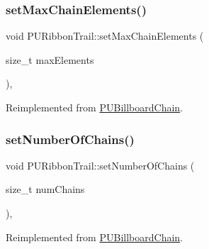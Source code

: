 \subsubsection{\texorpdfstring{set\+Max\+Chain\+Elements()}{setMaxChainElements()}\hspace{0.1cm}{\footnotesize\ttfamily [2/2]}}
{\footnotesize\ttfamily void P\+U\+Ribbon\+Trail\+::set\+Max\+Chain\+Elements (\begin{DoxyParamCaption}\item[{size\+\_\+t}]{max\+Elements }\end{DoxyParamCaption})\hspace{0.3cm}{\ttfamily [override]}, {\ttfamily [virtual]}}







Reimplemented from \hyperlink{classPUBillboardChain_aa58e00d60390334e66dd7742f708ee76}{P\+U\+Billboard\+Chain}.

\mbox{\label{classPURibbonTrail_a73dff6c67263bc49678ce73a16d03756}} 
\subsubsection{\texorpdfstring{set\+Number\+Of\+Chains()}{setNumberOfChains()}\hspace{0.1cm}{\footnotesize\ttfamily [1/2]}}
{\footnotesize\ttfamily void P\+U\+Ribbon\+Trail\+::set\+Number\+Of\+Chains (\begin{DoxyParamCaption}\item[{size\+\_\+t}]{num\+Chains }\end{DoxyParamCaption})\hspace{0.3cm}{\ttfamily [override]}, {\ttfamily [virtual]}}







Reimplemented from \hyperlink{classPUBillboardChain_afb09bb4c28a0475beb2c6575c7eeffa5}{P\+U\+Billboard\+Chain}.

\mbox{\label{classPURibbonTrail_a13906fbe3daa9f8b198fa95308dc30fb}} 
